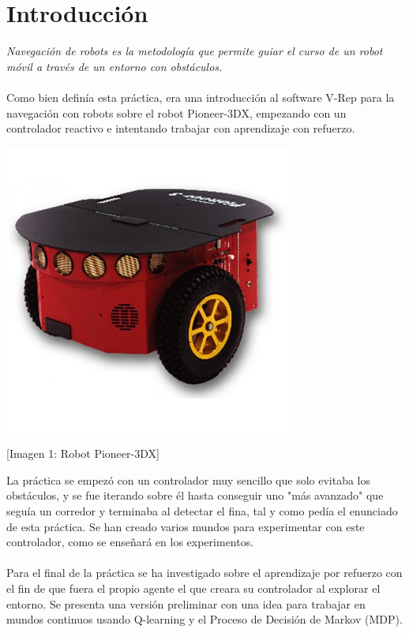 \documentclass[14pt]{extarticle}
\theoremstyle{definition}
\theoremstyle{remark}
\begin{document}
\section{Introducción}\label{sec:introduccion}
\textit{Navegación de robots es la metodología que permite guiar el curso de un robot móvil a través de un entorno con obstáculos. }\cite{pdf:navegacion_de_robot}
\\\\Como bien definía esta práctica, era una introducción al software V-Rep para la navegación con robots sobre el robot Pioneer-3DX, empezando con un controlador reactivo e intentando trabajar con aprendizaje con refuerzo.\\
\begin{center}
	\includegraphics[scale=0.6]{pioneer.jpg}
\end{center}
\begin{center}
	[Imagen 1: Robot Pioneer-3DX]
\end{center}
La práctica se empezó con un controlador muy sencillo que solo evitaba los obstáculos, y se fue iterando sobre él hasta conseguir uno "más avanzado" que seguía un corredor y terminaba al detectar el fina, tal y como pedía el enunciado de esta práctica. Se han creado varios mundos para experimentar con este controlador, como se enseñará en los experimentos.\\\\
Para el final de la práctica se ha investigado sobre el aprendizaje por refuerzo \cite{pdf:reinforcementlearning} con el fin de que fuera el propio agente el que creara su controlador al explorar el entorno. Se presenta una versión preliminar con una idea para trabajar en mundos continuos usando Q-learning \cite{pdf:qlearning1} \cite{pdf:qlearning2} y el Proceso de Decisión de Markov (MDP).
\end{document}
